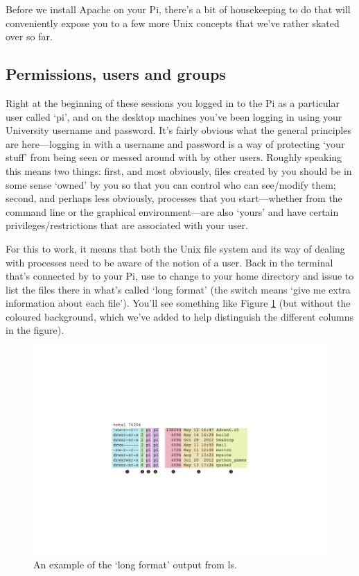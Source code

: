 Before we install Apache on your Pi, there's a bit of housekeeping to do that will conveniently expose you to a few more Unix concepts that we've rather skated over so far. 

\subsection{Permissions, users and groups}

Right at the beginning of these sessions you logged in to the Pi as a particular user called `pi', and on the desktop machines you've been logging in using your University username and password. It's fairly obvious what the general principles are here---logging in with a username and password is a way of protecting `your stuff' from being seen or messed around with by other users. Roughly speaking this means two things: first, and most obviously, files created by you should be in some sense `owned' by you so that you can control who can see/modify them; second, and perhaps less obviously, processes that you start---whether from the command line or the graphical environment---are also `yours' and have certain privileges/restrictions that are associated with your user. 

For this to work, it means that both the Unix file system and its way of dealing with processes need to be aware of the notion of a user. Back in the terminal that's connected by  to your Pi, use  to change to your home directory and issue  to list the files there in what's called `long format' (the  switch means `give me extra information about each file'). You'll see something like Figure \ref{figure:longformls} (but without the coloured background, which we've added to help distinguish the different columns in the figure).

\begin{figure}
\centerline{\includegraphics[width=14cm]{images/longformls}}
\caption{An example of the `long format' output from ls.}\label{figure:longformls}
\end{figure}

